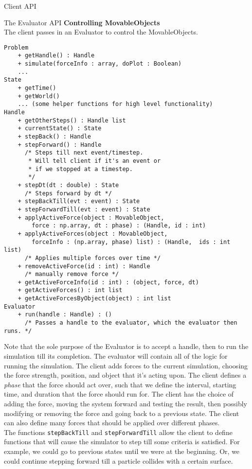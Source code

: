 \documentclass[11pt]{article}
\begin{document}
\begin{section}{Client API}
\begin{subsection}{The Evaluator API}
\textbf{Controlling MovableObjects}\\
The client passes in an Evaluator to control the MovableObjects. 
\begin{verbatim}
Problem
    + getHandle() : Handle
    + simulate(forceInfo : array, doPlot : Boolean)
    ...
State
    + getTime()
    + getWorld()
    ... (some helper functions for high level functionality)
Handle
    + getOtherSteps() : Handle list
    + currentState() : State
    + stepBack() : Handle
    + stepForward() : Handle
      /* Steps till next event/timestep. 
       * Will tell client if it's an event or
       * if we stopped at a timestep.
       */
    + stepDt(dt : double) : State
      /* Steps forward by dt */
    + stepBackTill(evt : event) : State
    + stepForwardTill(evt : event) : State
    + applyActiveForce(object : MovableObject, 
        force : np.array, dt : phase) : (Handle, id : int)
    + applyActiveForces(object : MovableObject, 
        forceInfo : (np.array, phase) list) : (Handle,  ids : int list)
      /* Applies multiple forces over time */
    + removeActiveForce(id : int) : Handle
      /* manually remove force */
    + getActiveForceInfo(id : int) : (object, force, dt)
    + getActiveForces() : int list
    + getActiveForcesByObject(object) : int list
Evaluator
    + run(handle : Handle) : () 
      /* Passes a handle to the evaluator, which the evaluator then runs. */
\end{verbatim}
Note that the sole purpose of the Evaluator is to accept a handle, then to run the simulation till its completion. The evaluator will contain all of the logic for running the simulation. The client adds forces to the current simulation, choosing the force strength, position, and object that it's acting upon. The client defines a \emph{phase} that the force should act over, such that we define the interval, starting time, and duration that the force should run for. The client has the choice of adding the force, moving the system forward and testing the result, then possibly modifying or removing the force and going back to a previous state. The client can also define many forces that should be applied over different phases.\\

The functions \verb|stepBackTill| and \verb|stepForwardTill| allow the client to define functions that will cause the simulator to step till some criteria is satisfied. For example, we could go to previous states until we were at the beginning. Or, we could continue stepping forward till a particle collides with a certain surface.\\


\end{subsection}
\end{section}
\end{document}
